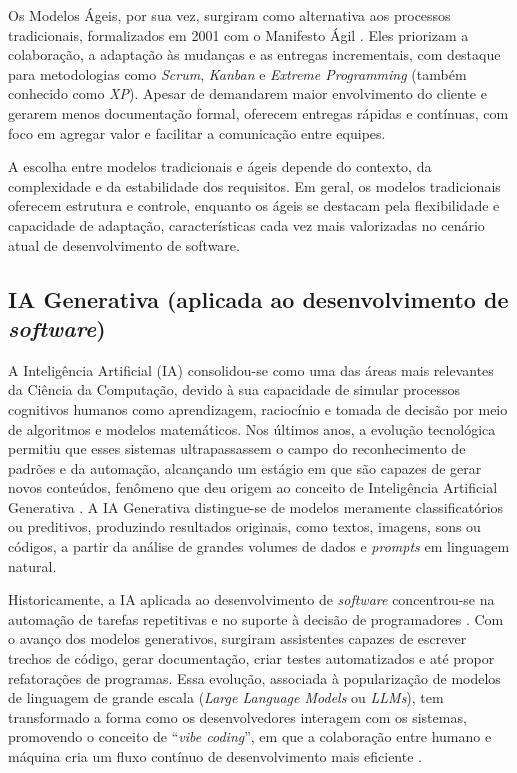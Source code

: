 \documentclass[english,brazilian]{UNISINOSartigo} %
\begin{document}
Os Modelos Ágeis, por sua vez, surgiram como alternativa aos processos tradicionais, formalizados em 2001 com o Manifesto Ágil \cite{beck2001}. Eles priorizam a colaboração, a adaptação às mudanças e as entregas incrementais, com destaque para metodologias como \textit{Scrum}, \textit{Kanban} e \textit{Extreme Programming} (também conhecido como \textit{XP}). Apesar de demandarem maior envolvimento do cliente e gerarem menos documentação formal, oferecem entregas rápidas e contínuas, com foco em agregar valor e facilitar a comunicação entre equipes.

A escolha entre modelos tradicionais e ágeis depende do contexto, da complexidade e da estabilidade dos requisitos. Em geral, os modelos tradicionais oferecem estrutura e controle, enquanto os ágeis se destacam pela flexibilidade e capacidade de adaptação, características cada vez mais valorizadas no cenário atual de desenvolvimento de software.

\subsection{IA Generativa (aplicada ao desenvolvimento de \textit{software})}

A Inteligência Artificial (IA) consolidou-se como uma das áreas mais relevantes da Ciência da Computação, devido à sua capacidade de simular processos cognitivos humanos como aprendizagem, raciocínio e tomada de decisão por meio de algoritmos e modelos matemáticos. Nos últimos anos, a evolução tecnológica permitiu que esses sistemas ultrapassassem o campo do reconhecimento de padrões e da automação, alcançando um estágio em que são capazes de gerar novos conteúdos, fenômeno que deu origem ao conceito de Inteligência Artificial Generativa \cite{basic2024, sauvola2024}. A IA Generativa distingue-se de modelos meramente classificatórios ou preditivos, produzindo resultados originais, como textos, imagens, sons ou códigos, a partir da análise de grandes volumes de dados e \textit{prompts} em linguagem natural.

Historicamente, a IA aplicada ao desenvolvimento de \textit{software} concentrou-se na automação de tarefas repetitivas e no suporte à decisão de programadores \cite{velpucharla2025}. Com o avanço dos modelos generativos, surgiram assistentes capazes de escrever trechos de código, gerar documentação, criar testes automatizados e até propor refatorações de programas. Essa evolução, associada à popularização de modelos de linguagem de grande escala (\textit{Large Language Models} ou \textit{LLMs}), tem transformado a forma como os desenvolvedores interagem com os sistemas, promovendo o conceito de “\textit{vibe coding}”, em que a colaboração entre humano e máquina cria um fluxo contínuo de desenvolvimento mais eficiente \cite{song2025}.
\end{document}
